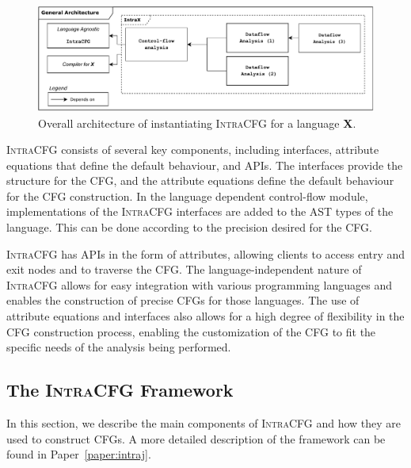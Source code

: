 \begin{figure}[H]
    \centering
    \includegraphics[width=1\textwidth]{kappa/img/architecture.pdf}
    \caption{\label{fig:intraCFG} Overall architecture of instantiating \textsc{IntraCFG} for a language \textbf{X}.}
\end{figure}

\textsc{IntraCFG} consists of several key components, including interfaces, attribute equations that define the
default behaviour, and APIs. The interfaces provide the structure for the
CFG, and the attribute equations define the default behaviour for the CFG
construction.
In the language dependent control-flow module, implementations of the \textsc{IntraCFG}
interfaces are added to the AST types of the language. This can be done according to the
precision desired for the CFG.

\textsc{IntraCFG} has APIs in the form of attributes, allowing clients to access entry
and exit nodes and to traverse the CFG.
The language-independent nature of \textsc{IntraCFG} allows for easy integration
with various programming languages and enables the construction of precise CFGs
for those languages. The use of attribute equations and interfaces also allows
for a high degree of flexibility in the CFG construction process,
enabling the customization of the CFG to fit the specific needs of the
analysis being performed.


\subsection{The \textsc{IntraCFG} Framework}
In this section, we describe the main components of \textsc{IntraCFG} and how they are used to construct CFGs.
A more detailed description of the framework can be found in Paper~\ref{paper:intraj}.

